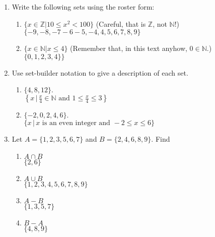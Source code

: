 \documentclass[11pt]{amsart}
\begin{document}
\begin{enumerate}


\item Write the following sets using the roster form:

\begin{enumerate}
\item $\{x \in \mathbb{Z} | 10\leq x^2< 100\}$ (Careful, that is $\mathbb Z$, not $\mathbb N$!)\\[3pt]
{\color{blue} $\{-9, -8, -7 -6 -5, -4, 4, 5, 6, 7, 8, 9\}$}\\[3pt]
\item  $\{x\in \mathbb{N} | x\leq 4\}$ (Remember that, in this text anyhow, $0\in \mathbb{N}$.)\\[3pt]
{\color{blue} $\{0, 1, 2, 3, 4\}\}$}\\[5pt]
\end{enumerate}

\item Use set-builder notation to give a description of each set.
\begin{enumerate}
\item $\{ 4, 8, 12\}.$\\[3pt]
{\color{blue} $\left\{ x \,|\, \frac{x}{4} \in \mathbb{N} \text{ and } 1\leq \frac{x}{4}\leq 3\right\}$}\\[3pt]
\item $\{-2, 0, 2, 4, 6\}.$\\[3pt]
{\color{blue} $\{ x \,|\, x \text{ is an even integer and } -2\leq x\leq 6\}$}\\[5pt]
\end{enumerate}

\vfill\break

\item  Let $A=\{1,2,3,5,6,7\}$ and $B=\{2,4,6,8,9\}$. Find 
\begin{enumerate}
\item $A\cap B$ \\[3pt]
{\color{blue} $\{ 2, 6\}$}\\[3pt]
\item $A\cup B$\\[3pt]
{\color{blue} $\{ 1, 2, 3, 4, 5, 6, 7, 8, 9\}$}\\[3pt]
\item $A-B$\\[3pt]
{\color{blue} $\{1, 3, 5, 7\}$}\\[3pt]
\item $B-A$\\[3pt]
{\color{blue} $\{ 4, 8, 9\}$}\\[3pt]
\end{enumerate}


\end{enumerate}
\end{document}
